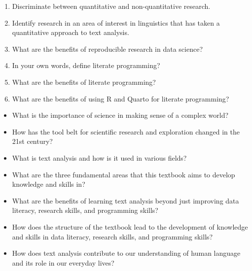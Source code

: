 \documentclass[
  letterpaper,
]{scrbook}
\providecommand{\tightlist}{%
  \setlength{\itemsep}{0pt}\setlength{\parskip}{0pt}}\usepackage{longtable,booktabs,array}
\begin{document}
\begin{tcolorbox}[enhanced jigsaw, title=\textcolor{quarto-callout-note-color}{\faInfo}\hspace{0.5em}{Conceptual questions}, titlerule=0mm, toptitle=1mm, colbacktitle=quarto-callout-note-color!10!white, bottomtitle=1mm, left=2mm, colframe=quarto-callout-note-color-frame, breakable, toprule=.15mm, colback=white, opacitybacktitle=0.6, leftrule=.75mm, rightrule=.15mm, bottomrule=.15mm, arc=.35mm, coltitle=black, opacityback=0]

\begin{enumerate}
\def\labelenumi{\arabic{enumi}.}
\tightlist
\item
  Discriminate between quantitative and non-quantitative research.
\item
  Identify research in an area of interest in linguistics that has taken
  a quantitative approach to text analysis.
\item
  What are the benefits of reproducible research in data science?
\item
  In your own words, define literate programming?
\item
  What are the benefits of literate programming?
\item
  What are the benefits of using R and Quarto for literate programming?
\end{enumerate}

\begin{itemize}
\tightlist
\item
  What is the importance of science in making sense of a complex world?
\item
  How has the tool belt for scientific research and exploration changed
  in the 21st century?
\item
  What is text analysis and how is it used in various fields?
\item
  What are the three fundamental areas that this textbook aims to
  develop knowledge and skills in?
\item
  What are the benefits of learning text analysis beyond just improving
  data literacy, research skills, and programming skills?
\item
  How does the structure of the textbook lead to the development of
  knowledge and skills in data literacy, research skills, and
  programming skills?
\item
  How does text analysis contribute to our understanding of human
  language and its role in our everyday lives?
\end{itemize}

\end{tcolorbox}
\end{document}
